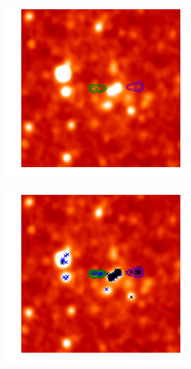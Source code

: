 \documentclass[a4paper]{article}
\begin{document}
\begin{figure}[!h]
\begin{subfigure}[b]{0.24\linewidth}
                \caption{}
                \label{radio}
            \end{subfigure}
            \begin{subfigure}[b]{0.24\linewidth}
                \includegraphics[width=\linewidth]{example_contours}
                \caption{}
                \label{contours}
            \end{subfigure}
            \begin{subfigure}[b]{0.24\linewidth}
                \includegraphics[width=\linewidth]{example_clicks}

\end{subfigure}
\end{figure}
\end{document}
